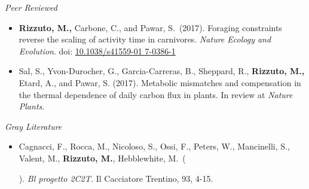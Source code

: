 
\vspace{7pt}

\emph{Peer Reviewed}
\begin{itemize}
    \item \textbf{Rizzuto, M.,} Carbone, C., and
    Pawar, S.~(2017). Foraging constraints reverse the scaling of
    activity time in carnivores. \emph{Nature Ecology and Evolution}.
    doi:
    \href{https://doi.org/10.1038/s41559-017-0386-1}{10.1038/s41559-01
    7-0386-1}
    \item Sal, S., Yvon-Durocher, G.,
    Garcia-Carreras, B., Sheppard, R., \textbf{Rizzuto, M.,} Etard, A.,
    and Pawar, S. (2017).
    Metabolic mismatches and compensation in the thermal dependence of
    daily carbon flux in plants. In review at \emph{Nature Plants}.
\end{itemize}

\medskip
\emph{Gray Literature}%

\begin{itemize}
  \item Cagnacci, F., Rocca, M., Nicoloso, S.,
  Ossi, F., Peters, W., Mancinelli, S., Valent, M., \textbf{Rizzuto,
  M.}, Hebblewhite, M.~(\date{2013}). \emph{Bl progetto 2C2T.} Il
  Cacciatore Trentino, 93, 4-15.
\end{itemize}
